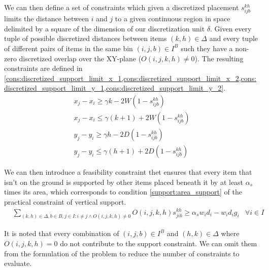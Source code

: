 We can then define a set of constraints which given a discretized placement $s^{k h}_{i j b}$ limits the distance between $i$ and $j$ to a given continuous region in space delimited by a square of the dimension of our discretization unit $\delta$. 
Given every tuple of possible discretized distances between items $ (k, h) \in \Delta$ and every tuple of different pairs of items in the same bin $(i, j, b) \in I^B$ such they have a non-zero discretized overlap over the XY-plane ($O(i, j, k, h) \neq 0$). The resulting constraints are defined in \cref{cons:discretized_support_limit_x_1,cons:discretized_support_limit_x_2,cons:discretized_support_limit_y_1,cons:discretized_support_limit_y_2}.
\begin{align}
    & x_j - x_i \ge \gamma k - 2W( 1 - s^{k h}_{i j b}) &  \label{cons:discretized_support_limit_x_1} \\
    & x_j - x_i \le \gamma (k + 1) + 2W( 1 - s^{k h}_{i j b}) &  \label{cons:discretized_support_limit_x_2} \\
    & y_j - y_i \ge \gamma h - 2D( 1 - s^{k h}_{i j b}) &  \label{cons:discretized_support_limit_y_1} \\
    & y_j - y_i \le \gamma (h + 1) + 2D( 1 - s^{k h}_{i j b}) &  \label{cons:discretized_support_limit_y_2}
\end{align}

We can then introduce a feasibility constraint thet ensures that every item that isn't on the ground is supported by other items placed beneath it by at least $\alpha_s$ times its area, which corresponds to condition \ref{support:area_support} of the practical constraint of vertical support.
\begin{eqnarray}
    & \sum\limits_{(k, h) \in \Delta, b \in B, j \in I : i \neq j \land O(i, j, k, h) \neq 0}{ O(i, j, k, h)s^{k h}_{j i b}} \ge \alpha_s w_i d_i - w_i d_i g_i & \forall i \in I \label{cons:every_item_is_supported}
\end{eqnarray}

It is noted that every combination of $(i,j,b) \in I^B$ and $(h,k) \in \Delta$ where $O(i, j, k, h) = 0$ do not contribute to the support constraint. We can omit them from the formulation of the problem to reduce the number of constraints to evaluate.